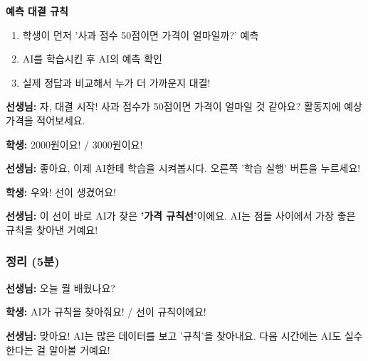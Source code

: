 \documentclass[12pt,a4paper]{article}
\begin{document}
\begin{tcolorbox}[colback=lightpurple,colframe=purple,title=\textbf{【활동 2: 나 vs AI 예측 대결! - 15분】 \texttwemoji{trophy}}]
\textbf{ 예측 대결 규칙}
\begin{enumerate}
    \item 학생이 먼저 '사과 점수 50점이면 가격이 얼마일까?' 예측
    \item AI를 학습시킨 후 AI의 예측 확인
    \item 실제 정답과 비교해서 누가 더 가까운지 대결!
\end{enumerate}

\vspace{0.3cm}
 \textbf{선생님:} 자, 대결 시작! 사과 점수가 50점이면 가격이 얼마일 것 같아요? 활동지에 예상 가격을 적어보세요.

\vspace{0.2cm}
 \textbf{학생:} 2000원이요! / 3000원이요!

\vspace{0.2cm}
 \textbf{선생님:} 좋아요, 이제 AI한테 학습을 시켜봅시다. 오른쪽 '학습 실행' 버튼을 누르세요!

\vspace{0.2cm}
 \textbf{학생:} 우와! 선이 생겼어요!

\vspace{0.2cm}
 \textbf{선생님:} 이 선이 바로 AI가 찾은 \textbf{'가격 규칙선'}이에요. AI는 점들 사이에서 가장 좋은 규칙을 찾아낸 거예요!
\end{tcolorbox}

\subsubsection{정리 (5분)}

\begin{tcolorbox}[colback=lightcyan,colframe=cyan]
 \textbf{선생님:} 오늘 뭘 배웠나요?

\vspace{0.2cm}
 \textbf{학생:} AI가 규칙을 찾아줘요! / 선이 규칙이에요!

\vspace{0.2cm}
 \textbf{선생님:} 맞아요! AI는 많은 데이터를 보고 '규칙'을 찾아내요. 다음 시간에는 AI도 실수한다는 걸 알아볼 거예요!
\end{tcolorbox}
\end{document}
